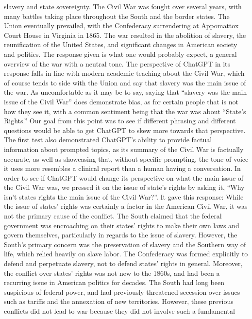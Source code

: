 \documentclass[letterpaper, 10 pt, conference]{ieeeconf}  %
\begin{document}
slavery and state sovereignty.
The Civil War was fought over several years, with many battles taking place throughout the South
and the border states. The Union eventually prevailed, with the Confederacy surrendering at
Appomattox Court House in Virginia in 1865. The war resulted in the abolition of slavery, the
reunification of the United States, and significant changes in American society and politics.
The response given is what one would probably expect, a general overview of the war with a neutral tone. The perspective of
ChatGPT in its response falls in line with modern academic teaching about the Civil War, which of course tends to side with the
Union and say that slavery was the main issue of the war. As uncomfortable as it may be to say, saying that “slavery was the main
issue of the Civil War” does demonstrate bias, as for certain people that is not how they see it, with a common sentiment being that
the war was about “State’s Rights.” Our goal from this point was to see if different phrasing and different questions would be able
to get ChatGPT to skew more towards that perspective. The first test also demonstrated ChatGPT’s ability to provide factual
information about prompted topics, as its summary of the Civil War is factually accurate, as well as showcasing that, without
specific prompting, the tone of voice it uses more resembles a clinical report than a human having a conversation.
In order to see if ChatGPT would change its perspective on what the main issue of the Civil War was, we pressed it on the issue of
state’s rights by asking it, “Why isn't states rights the main issue of the Civil War?”. It gave this response:
While the issue of states' rights was certainly a factor in the American Civil War, it was not the primary cause of the
conflict. The South claimed that the federal government was encroaching on their states' rights to make their own laws
and govern themselves, particularly in regards to the issue of slavery. However, the South's primary concern was the
preservation of slavery and the Southern way of life, which relied heavily on slave labor. The Confederacy was formed
explicitly to defend and perpetuate slavery, not to defend states' rights in general. Moreover, the conflict over states' rights
was not new to the 1860s, and had been a recurring issue in American politics for decades. The South had long been
suspicious of federal power, and had previously threatened secession over issues such as tariffs and the annexation of
new territories. However, these previous conflicts did not lead to war because they did not involve such a fundamental
\end{document}
